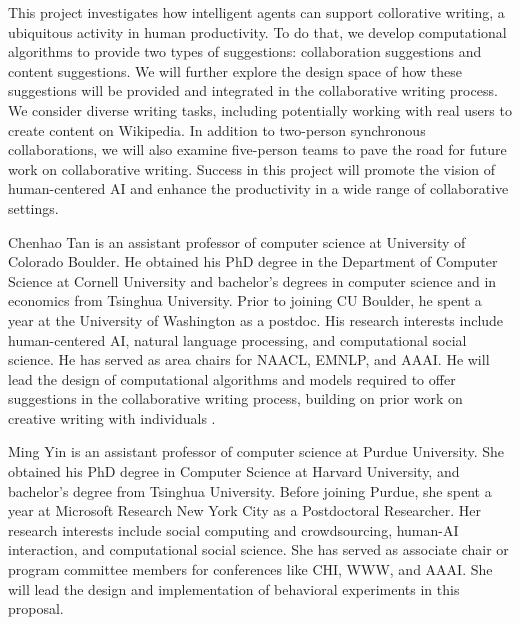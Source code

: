 







This project investigates how intelligent agents can support collorative writing, a ubiquitous activity in human productivity.
To do that, we develop computational algorithms to provide two types of suggestions: collaboration suggestions and content suggestions.
We will further explore the design space of how these suggestions will be provided and integrated in the collaborative writing process.
We consider diverse writing tasks, including potentially working with real users to create content on Wikipedia.
In addition to two-person synchronous collaborations, we will also examine five-person teams to pave the road for future work on collaborative writing.
Success in this project will promote the vision of human-centered AI and enhance the productivity in a wide range of collaborative settings.

Chenhao Tan is an assistant professor of computer science at University of Colorado Boulder. He obtained his PhD degree in the Department of Computer Science at Cornell University and bachelor's degrees in computer science and in economics from Tsinghua University. Prior to joining CU Boulder, he spent a year at the University of Washington as a postdoc. His research interests include human-centered AI, natural language processing, and computational social science. 
He has served as area chairs for NAACL, EMNLP, and AAAI.
He will lead the design of computational algorithms and models required to offer suggestions in the collaborative writing process, building on prior work on creative writing with individuals \citep{clark+etal18}.

Ming Yin is an assistant professor of computer science at Purdue University. She obtained his PhD degree in Computer Science at Harvard University, and bachelor's degree from Tsinghua University. Before joining Purdue, she spent a year at Microsoft Research New York City as a Postdoctoral Researcher. Her research interests include social computing and crowdsourcing, human-AI interaction, and computational social science. She has served as associate chair or program committee members for conferences like CHI, WWW, and AAAI. She will lead the design and implementation of behavioral experiments in this proposal.